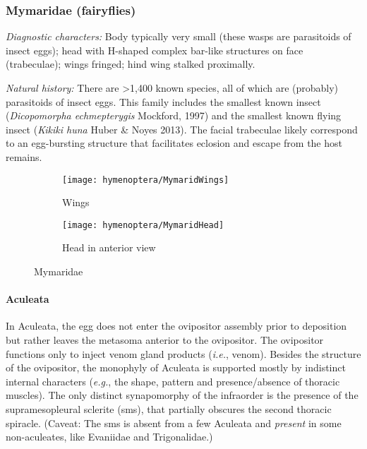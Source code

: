 \subsubsection{Mymaridae (fairyflies)}
\noindent{}\textit{Diagnostic characters:} Body typically very small (these wasps are parasitoids of insect eggs); head with H-shaped complex bar-like structures on face (trabeculae); wings fringed; hind wing stalked proximally.\vspace{3mm}

\noindent{}\textit{Natural history:} There are \textgreater1,400 known species, all of which are (probably) parasitoids of insect eggs. This family includes the smallest known insect (\textit{Dicopomorpha echmepterygis} Mockford, 1997) and the smallest known flying insect (\textit{Kikiki huna} Huber \& Noyes 2013). The facial trabeculae likely correspond to an egg-bursting structure that facilitates eclosion and escape from the host remains.

\begin{figure}[ht!]
  \centering
\begin{subfigure}[ht!]{0.5\textwidth}
    \texttt{[image: hymenoptera/MymaridWings]}
  \caption{Wings}
  \label{fig:mymarid1}
\end{subfigure}
    \qquad
\begin{subfigure}[ht!]{0.28\textwidth}
    \texttt{[image: hymenoptera/MymaridHead]}
  \caption{Head in anterior view}
  \label{fig:mymarid2}
\end{subfigure}
    \caption{Mymaridae \citep[][pg. 87]{goulet1993hymenoptera}}\label{fig:mymarids}
\end{figure}

\paragraph*{Aculeata} In Aculeata, the egg does not enter the ovipositor assembly prior to deposition but rather leaves the metasoma anterior to the ovipositor. The ovipositor functions only to inject venom gland products (\textit{i.e.}, venom). Besides the structure of the ovipositor, the monophyly of Aculeata is supported mostly by indistinct internal characters (\textit{e.g.}, the shape, pattern and presence/absence of thoracic muscles). The only distinct synapomorphy of the infraorder is the presence of the supramesopleural sclerite (sms), that partially obscures the second thoracic spiracle. (Caveat: The sms is absent from a few Aculeata and \textit{present} in some non-aculeates, like Evaniidae and Trigonalidae.)\vspace{3mm}

